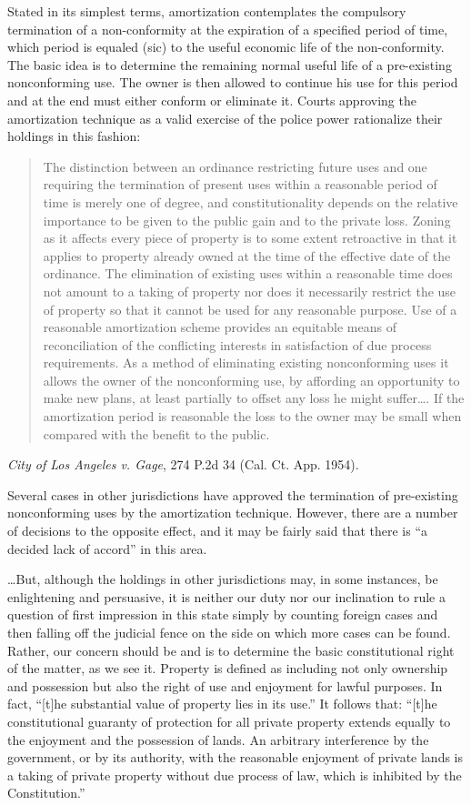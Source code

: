Stated in its simplest terms, amortization contemplates the compulsory
termination of a non-conformity at the expiration of a specified period of time,
which period is equaled (sic) to the useful economic life of the
non-conformity. The basic idea is to determine the remaining normal useful
life of a pre-existing nonconforming use. The owner is then allowed to continue
his use for this period and at the end must either conform or eliminate it.
Courts approving the amortization technique as a valid exercise of the police
power rationalize their holdings in this fashion:
\begin{quote}
The distinction between an
ordinance restricting future uses and one requiring the termination of present
uses within a reasonable period of time is merely one of degree, and
constitutionality depends on the relative importance to be given to the public
gain and to the private loss. Zoning as it affects every piece of property is to
some extent retroactive in that it applies to property already owned at the time
of the effective date of the ordinance. The elimination of existing uses within
a reasonable time does not amount to a taking of property nor does it
necessarily restrict the use of property so that it cannot be used for any
reasonable purpose. Use of a reasonable amortization scheme provides an
equitable means of reconciliation of the conflicting interests in satisfaction
of due process requirements. As a method of eliminating existing nonconforming
uses it allows the owner of the nonconforming use, by affording an opportunity
to make new plans, at least partially to offset any loss he might suffer\ldots .
If the amortization period is reasonable the loss to the owner may be small when
compared with the benefit to the public.
\end{quote}
\emph{City of Los Angeles v. Gage}, 274 P.2d 34 (Cal. Ct. App. 1954).

Several cases in other jurisdictions have approved the termination of
pre-existing nonconforming uses by the amortization technique. However, there
are a number of decisions to the opposite effect, and it may be fairly said that
there is ``a decided lack of accord'' in this area. 

\ldots But, although the holdings in other jurisdictions may, in some instances,
be enlightening and persuasive, it is neither our duty nor our inclination to
rule a question of first impression in this state simply by counting foreign
cases and then falling off the judicial fence on the side on which more cases
can be found. Rather, our concern should be and is to determine the basic
constitutional right of the matter, as we see it. Property is defined as
including not only ownership and possession but also the right of use and
enjoyment for lawful purposes. In fact, ``[t]he substantial value of property
lies in its use.'' It follows that: ``[t]he constitutional guaranty of
protection for all private property extends equally to the enjoyment and the
possession of lands. An arbitrary interference by the government, or by its
authority, with the reasonable enjoyment of private lands is a taking of private
property without due process of law, which is inhibited by the Constitution.''

